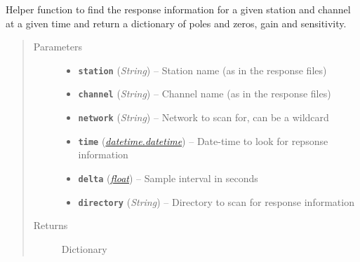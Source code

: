 \documentclass[a4paper,10pt,english]{sphinxmanual}
\begin{document}
\begin{fulllineitems}
\label{utils:mag_calc._find_resp}
Helper function to find the response information for a given station and
channel at a given time and return a dictionary of poles and zeros, gain
and sensitivity.
\begin{quote}\begin{description}
\item[{Parameters}] \leavevmode\begin{itemize}
\item {} 
\textbf{\texttt{station}} (\emph{String}) -- Station name (as in the response files)

\item {} 
\textbf{\texttt{channel}} (\emph{String}) -- Channel name (as in the response files)

\item {} 
\textbf{\texttt{network}} (\emph{String}) -- Network to scan for, can be a wildcard

\item {} 
\textbf{\texttt{time}} (\href{https://docs.python.org/library/datetime.html\#datetime.datetime}{\emph{datetime.datetime}}) -- Date-time to look for repsonse information

\item {} 
\textbf{\texttt{delta}} (\href{https://docs.python.org/library/functions.html\#float}{\emph{float}}) -- Sample interval in seconds

\item {} 
\textbf{\texttt{directory}} (\emph{String}) -- Directory to scan for response information

\end{itemize}

\item[{Returns}] \leavevmode
Dictionary

\end{description}\end{quote}

\end{fulllineitems}

\end{document}
